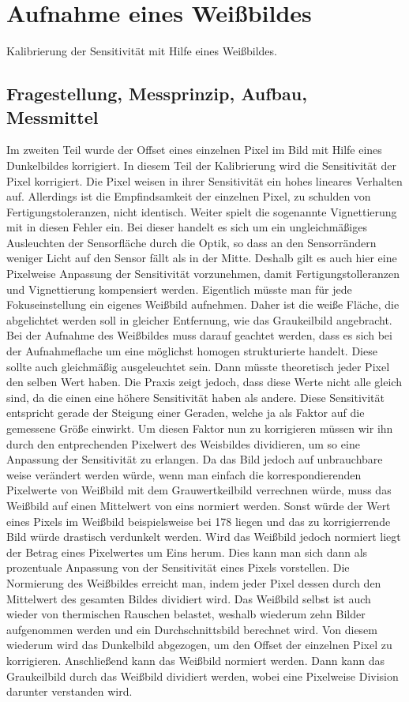 %
%
\chapter{Aufnahme eines Weißbildes}
\label{chap:VERSUCH_3}
Kalibrierung der Sensitivität mit Hilfe eines Weißbildes.
\section{Fragestellung, Messprinzip, Aufbau, Messmittel}
\label{chap:VERSUCH_3_FRAGESTELLUNG}
Im zweiten Teil wurde der Offset eines einzelnen Pixel im Bild mit Hilfe eines Dunkelbildes korrigiert. In diesem Teil der Kalibrierung wird die Sensitivität der Pixel korrigiert. Die Pixel weisen in ihrer Sensitivität ein hohes lineares Verhalten auf. Allerdings ist die Empfindsamkeit der einzelnen Pixel, zu schulden von Fertigungstoleranzen, nicht identisch. Weiter spielt die sogenannte Vignettierung mit in diesen Fehler ein. Bei dieser handelt es sich um ein ungleichmäßiges Ausleuchten der Sensorfläche durch die Optik, so dass an den Sensorrändern weniger Licht auf den Sensor fällt als in der Mitte. Deshalb gilt es auch hier eine Pixelweise Anpassung der Sensitivität vorzunehmen, damit Fertigungstolleranzen und Vignettierung kompensiert werden. Eigentlich müsste man für jede Fokuseinstellung ein eigenes Weißbild aufnehmen. Daher ist die weiße Fläche, die abgelichtet werden soll in gleicher Entfernung, wie das Graukeilbild angebracht. 
Bei der Aufnahme des Weißbildes muss darauf geachtet werden, dass es sich bei der Aufnahmeflache um eine möglichst homogen strukturierte handelt. Diese sollte auch gleichmäßig ausgeleuchtet sein.
Dann müsste theoretisch jeder Pixel den selben Wert haben. Die Praxis zeigt jedoch, dass diese Werte nicht alle gleich sind, da die einen eine höhere Sensitivität haben als andere. Diese Sensitivität entspricht gerade der Steigung einer Geraden, welche ja als Faktor auf die gemessene Größe einwirkt. Um diesen Faktor nun zu korrigieren müssen wir ihn durch den entprechenden Pixelwert des Weisbildes dividieren, um so eine Anpassung der Sensitivität zu erlangen. Da das Bild jedoch auf unbrauchbare weise verändert werden würde, wenn man einfach die korrespondierenden Pixelwerte von Weißbild mit dem Grauwertkeilbild verrechnen würde, muss das Weißbild auf einen Mittelwert von eins normiert werden. Sonst würde der Wert eines Pixels im Weißbild beispielsweise bei 178 liegen und das zu korrigierrende Bild würde drastisch verdunkelt werden. Wird das Weißbild jedoch normiert liegt der Betrag eines Pixelwertes um Eins herum. Dies kann man sich dann als prozentuale Anpassung von der Sensitivität eines Pixels vorstellen. Die Normierung des Weißbildes erreicht man, indem jeder Pixel dessen durch den Mittelwert des gesamten Bildes dividiert wird.
Das Weißbild selbst ist auch wieder von thermischen Rauschen belastet, weshalb wiederum zehn Bilder aufgenommen werden und ein Durchschnittsbild berechnet wird. Von diesem wiederum wird das Dunkelbild abgezogen, um den Offset der einzelnen Pixel zu korrigieren. Anschließend kann das Weißbild normiert werden.
Dann kann das Graukeilbild durch das Weißbild dividiert werden, wobei eine Pixelweise Division darunter verstanden wird.

